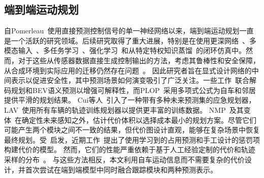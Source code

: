 \documentclass[10pt,twocolumn,letterpaper]{article}
\begin{document}
\subsection{端到端运动规划}
自Pomerleau~\cite{pomerleau1988alvinn}使用直接预测控制信号的单一神经网络以来，端到端运动规划一直是一个活跃的研究领域。后续研究取得了重大进展，特别是在使用更深网络~\cite{bojarski2016nvend}、多模态输入~\cite{bansal2018chauffeurnet, codevilla2018cil, prakash2021transfuser}、多任务学习~\cite{wu2022tcp, Chitta2022transfuserpami}、强化学习~\cite{liang2018cirl, kendall2019driveaday, MaRLn, Chekroun2021gri, chen2021wor}和从特定特权知识蒸馏~\cite{chen2020lbc, zhang2021roach, zhang2021lbw}的闭环仿真中。然而，对于这些从传感器数据直接生成控制输出的方法，考虑其鲁棒性和安全保障，从合成环境到实际应用的迁移仍然存在问题~\cite{codevilla2019cilrs, hu2022stp3}。
%
因此研究者旨在显式设计网络的中间表示以促进安全性，其中预测场景如何演变吸引了广泛关注。一些工作~\cite{chitta2021neat, shao2022interfuser, hu2022mile}联合解码规划和BEV语义预测以增强可解释性，而PLOP~\cite{Buhet2020plop}采用多项式公式为自车和邻居提供平滑的规划结果。
%
Cui等人~\cite{cui2021lookout}引入了一种带有多种未来预测集的应急规划器，LAV~\cite{chen2022lav}使用所有车辆的轨迹训练规划器以提供更丰富的训练数据。
%
NMP~\cite{zeng2019nmp}及其变体~\cite{wei2021sanmp}在确定性未来感知之外，估计代价体积以选择成本最小的规划方案。尽管它们可能产生两个模块之间不一致的结果，但代价图设计直观，能够在复杂场景中恢复最终规划。受~\cite{zeng2019nmp}启发，近期工作~\cite{zeng2020dsdnet, sadat2020p3, casas2021mp3, hu2022stp3, hu2021safe}提出了使用学习到的占用预测和手工设计的惩罚项构建代价的模型。
%
然而，它们的性能严重依赖于基于人工经验定制的代价和轨迹采样的分布~\cite{khurana2022ssocc}。
%
与这些方法相反，本文利用自车运动信息而不需要复杂的代价设计，并首次尝试在端到端模型中同时融合跟踪模块和两种预测表示。
\end{document}
